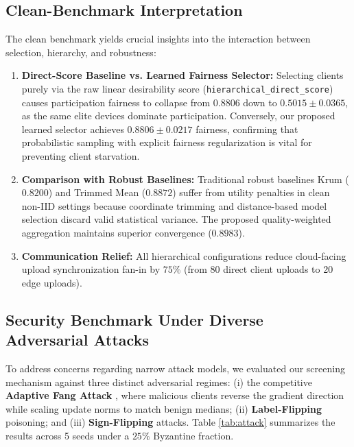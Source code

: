 \documentclass[conference]{IEEEtran}
\begin{document}
\subsection{Clean-Benchmark Interpretation}
The clean benchmark yields crucial insights into the interaction between selection, hierarchy, and robustness:
\begin{enumerate}
    \item \textbf{Direct-Score Baseline vs. Learned Fairness Selector:} Selecting clients purely via the raw linear desirability score (\texttt{hierarchical\_direct\_score}) causes participation fairness to collapse from $0.8806$ down to $0.5015 \pm 0.0365$, as the same elite devices dominate participation. Conversely, our proposed learned selector achieves $0.8806 \pm 0.0217$ fairness, confirming that probabilistic sampling with explicit fairness regularization is vital for preventing client starvation.
    \item \textbf{Comparison with Robust Baselines:} Traditional robust baselines Krum ($0.8200$) and Trimmed Mean ($0.8872$) suffer from utility penalties in clean non-IID settings because coordinate trimming and distance-based model selection discard valid statistical variance. The proposed quality-weighted aggregation maintains superior convergence ($0.8983$).
    \item \textbf{Communication Relief:} All hierarchical configurations reduce cloud-facing upload synchronization fan-in by $75\%$ (from 80 direct client uploads to 20 edge uploads).
\end{enumerate}

\subsection{Security Benchmark Under Diverse Adversarial Attacks}
To address concerns regarding narrow attack models, we evaluated our screening mechanism against three distinct adversarial regimes: (i) the competitive \textbf{Adaptive Fang Attack} \cite{fang2020local}, where malicious clients reverse the gradient direction while scaling update norms to match benign medians; (ii) \textbf{Label-Flipping} poisoning; and (iii) \textbf{Sign-Flipping} attacks. Table \ref{tab:attack} summarizes the results across 5 seeds under a $25\%$ Byzantine fraction.
\end{document}
